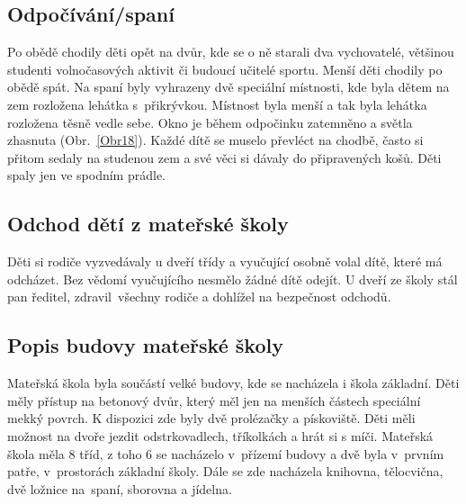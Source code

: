 		\subsection{Odpočívání/spaní}
		\label{spani}
			Po obědě chodily děti opět na dvůr, kde se o ně starali dva vychovatelé, většinou studenti volnočasových aktivit či budoucí učitelé sportu.
			Menší děti chodily po obědě spát. Na spaní byly vyhrazeny dvě speciální místnosti, kde byla dětem na zem rozložena lehátka s přikrývkou. Místnost byla menší a tak byla lehátka rozložena těsně vedle sebe. Okno je během odpočinku zatemněno a světla zhasnuta (Obr.~\ref{Obr18}).
			Každé dítě se muselo převléct na chodbě, často si přitom sedaly na studenou zem a své věci si dávaly do připravených košů. Děti spaly jen ve spodním prádle. 	

		\subsection{Odchod dětí z mateřské školy}
			Děti si rodiče vyzvedávaly u dveří třídy a vyučující osobně volal dítě, které má odcházet. Bez vědomí vyučujícího nesmělo žádné dítě odejít. U dveří ze školy stál pan ředitel, zdravil všechny rodiče a dohlížel na bezpečnost odchodů. 

		\subsection{Popis budovy mateřské školy}

			Mateřská škola byla součástí velké budovy, kde se nacházela i škola základní. Děti měly přístup na betonový dvůr, který měl jen na menších částech speciální mekký povrch. K dispozici zde byly dvě prolézačky a pískoviště. Děti měli možnost na dvoře jezdit odstrkovadlech, tříkolkách a hrát si s míči. 
			Mateřská škola měla 8 tříd, z toho 6 se nacházelo v přízemí budovy a dvě byla v prvním patře, v prostorách 	základní školy. Dále se zde nacházela knihovna, tělocvična, dvě ložnice na spaní, sborovna a jídelna. 

